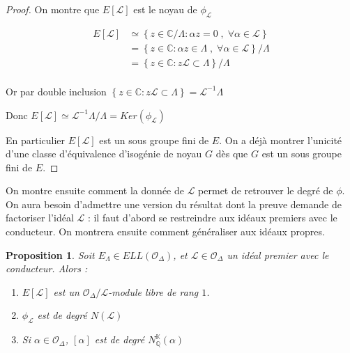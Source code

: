 \documentclass{article}
\newcommand{\Q}[0]{\mathbb{Q}}
\newcommand{\C}[0]{\mathbb{C}}
\newcommand{\K}[0]{\mathbb{K}}
\newcommand{\OR}[0]{\mathcal{O}}
\newcommand{\LR}[0]{\mathcal{L}}
\newtheorem{Prop}[The]{Proposition}
\begin{document}
\begin{proof}
	
	On montre que $E\left[ \LR\right]$ est le noyau de $\phi_{\LR}$
	
	\begin{align*}
		E\left[ \LR\right]&\simeq \left\lbrace z\in\C/\Lambda : \alpha z = 0 \;,\; \forall\alpha\in\LR\right\rbrace \\
		&=\left\lbrace z\in\C : \alpha z\in\Lambda \;,\;\forall\alpha\in\LR\right\rbrace / \Lambda\\
		&=\left\lbrace z\in\C : z\LR\subset\Lambda\right\rbrace / \Lambda\\
	\end{align*}
	
	Or par double inclusion $\left\lbrace z\in\C : z\LR\subset\Lambda\right\rbrace = \LR^{-1}\Lambda$
	
	Donc $E\left[ \LR\right]\simeq\LR^{-1}\Lambda/\Lambda = Ker(\phi_{\LR})$
	
	En particulier $E\left[ \LR\right]$ est un sous groupe fini de $E$. On a déjà montrer l'unicité d'une classe d'équivalence d'isogénie de noyau $G$ dès que $G$ est un sous groupe fini de $E$. 
	
\end{proof}

On montre ensuite comment la donnée de $\LR$ permet de retrouver le degré de $\phi$. On aura besoin d'admettre une version du résultat dont la preuve demande de factoriser l'idéal $\LR$ : il faut d'abord se restreindre aux idéaux premiers avec le conducteur. On montrera ensuite comment généraliser aux idéaux propres. 

\begin{Prop}
	
	Soit $E_{\Lambda}\in ELL(\OR_{\Delta})$, et $\LR\in\OR_{\Delta}$ un idéal premier avec le conducteur. Alors :
	
	\begin{enumerate}
		\item $E\left[\LR\right]$ est un $\OR_{\Delta}/\LR$-module libre de rang $1$.
		\item $\phi_{\LR}$ est de degré $N\left( \LR\right)$ 
		\item Si $\alpha\in\OR_{\Delta}$, $[\alpha]$ est de degré $N_{\Q}^{\K}\left( \alpha\right) $
	\end{enumerate}
	
\end{Prop}
\end{document}
